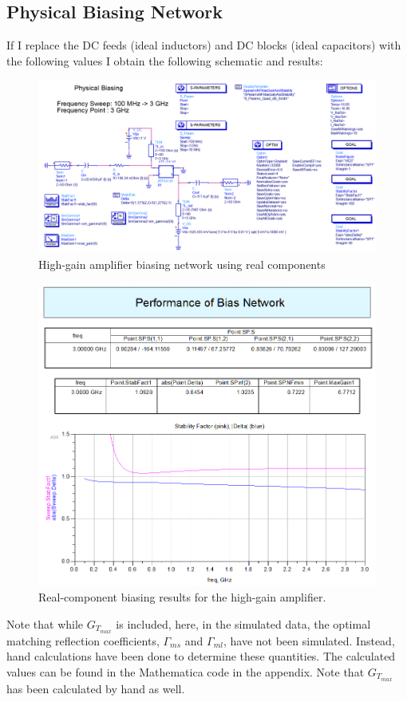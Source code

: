\subsection{Physical Biasing Network}
If I replace the DC feeds (ideal inductors) and DC blocks (ideal capacitors)
with the following values I obtain the following schematic and results:

\begin{figure}[H]
    \centering
    \includegraphics[width=0.8\linewidth]{Images/A2P1PhysicalSchematic.png}
    \caption{High-gain amplifier biasing network using real components}
    \label{fig:A2P1PhysicalSchematic}
\end{figure}

\begin{figure}[H]
    \centering
    \includegraphics[width=0.8\linewidth]{Images/A2P1PhysicalBiasingResults.png}
    \caption{Real-component biasing results for the high-gain amplifier.}
    \label{fig:A2P1PhysicalBiasingResults}
\end{figure}

Note that while $G_{T_{max}}$ is included, here, in the simulated data, the
optimal matching reflection coefficients, $\Gamma_{ms}$ and $\Gamma_{ml}$, have
not been simulated. Instead, hand calculations have been done to determine these
quantities. The calculated values can be found in the Mathematica code in the
appendix. Note that $G_{T_{max}}$ has been calculated by hand as well.

